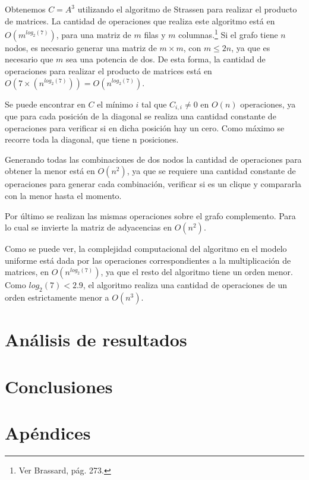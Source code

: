 \documentclass[a4paper, 12pt]{article}
\begin{document}
Obtenemos $C = A^3$ utilizando el algoritmo de Strassen para realizar el producto de matrices. La cantidad de operaciones que realiza este algoritmo est\'a en $O\left(m^{log_2\left(7\right)}\right)$, para una matriz de $m$ filas y $m$ columnas.\footnote{Ver Brassard, p\'ag. 273.} Si el grafo tiene $n$ nodos, es necesario generar una matriz de $m \times m$, con $m \leq 2n$, ya que es necesario que $m$ sea una potencia de dos. De esta forma, la cantidad de operaciones para realizar el producto de matrices est\'a en $O\left(7 \times \left(n ^{log_2 \left( 7\right)} \right) \right) = O\left(n^{log_2\left(7\right)}\right)$.



Se puede encontrar en $C$ el m\'inimo $i$ tal que $C_{i,i} \neq 0$ en $O\left(n\right)$ operaciones, ya que para cada posici\'on de la diagonal se realiza una cantidad constante de operaciones para verificar si en dicha posici\'on hay un cero. Como m\'aximo se recorre toda la diagonal, que tiene n posiciones.


Generando todas las combinaciones de dos nodos la cantidad de operaciones para obtener la menor est\'a en $O\left(n^2\right)$, ya que se requiere una cantidad constante de operaciones para generar cada combinaci\'on, verificar si es un clique y compararla con la menor hasta el momento.


Por \'ultimo se realizan las mismas operaciones sobre el grafo complemento. Para lo cual se invierte la matriz de adyacencias en $O \left( n^2 \right)$.


Como se puede ver, la complejidad computacional del algoritmo en el modelo uniforme est\'a dada por las operaciones correspondientes a la multiplicaci\'on de matrices, en $O \left( n^{log_2\left(7\right)} \right) $, ya que el resto del algoritmo tiene un orden menor. Como $log_2\left(7\right) < 2.9 $, el algoritmo realiza una cantidad de operaciones de un orden estrictamente menor a $O\left( n^3\right) $.




\section*{An\'alisis de resultados}
\section*{Conclusiones}

\section*{Ap\'endices}
\end{document}
